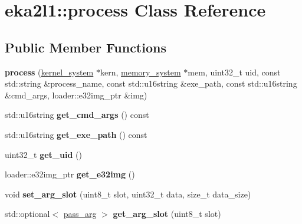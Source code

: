 \hypertarget{classeka2l1_1_1process}{}\section{eka2l1\+:\+:process Class Reference}
\label{classeka2l1_1_1process}
\subsection*{Public Member Functions}
\begin{DoxyCompactItemize}
\item 
\mbox{\label{classeka2l1_1_1process_a84093e7f336abaec65065502674b246a}} 
{\bfseries process} (\mbox{\hyperlink{classeka2l1_1_1kernel__system}{kernel\+\_\+system}} $\ast$kern, \mbox{\hyperlink{classeka2l1_1_1memory__system}{memory\+\_\+system}} $\ast$mem, uint32\+\_\+t uid, const std\+::string \&process\+\_\+name, const std\+::u16string \&exe\+\_\+path, const std\+::u16string \&cmd\+\_\+args, loader\+::e32img\+\_\+ptr \&img)
\item 
\mbox{\label{classeka2l1_1_1process_a65b3ca3a58e733b5af6158a9a019de12}} 
std\+::u16string {\bfseries get\+\_\+cmd\+\_\+args} () const
\item 
\mbox{\label{classeka2l1_1_1process_aa32a3d626672ba40226f63682ace5419}} 
std\+::u16string {\bfseries get\+\_\+exe\+\_\+path} () const
\item 
\mbox{\label{classeka2l1_1_1process_a4394568f5fcdc49fd8c0dced88957e33}} 
uint32\+\_\+t {\bfseries get\+\_\+uid} ()
\item 
\mbox{\label{classeka2l1_1_1process_aba1a81a92b41bed87fc83ad8bc186776}} 
loader\+::e32img\+\_\+ptr {\bfseries get\+\_\+e32img} ()
\item 
\mbox{\label{classeka2l1_1_1process_ad150f4afef9becebd91ed5f75331a25d}} 
void {\bfseries set\+\_\+arg\+\_\+slot} (uint8\+\_\+t slot, uint32\+\_\+t data, size\+\_\+t data\+\_\+size)
\item 
\mbox{\label{classeka2l1_1_1process_a3e5a24d9ebc09bec3e94f1aced362b4b}} 
std\+::optional$<$ \mbox{\hyperlink{structeka2l1_1_1pass__arg}{pass\+\_\+arg}} $>$ {\bfseries get\+\_\+arg\+\_\+slot} (uint8\+\_\+t slot)

\end{DoxyCompactItemize}
